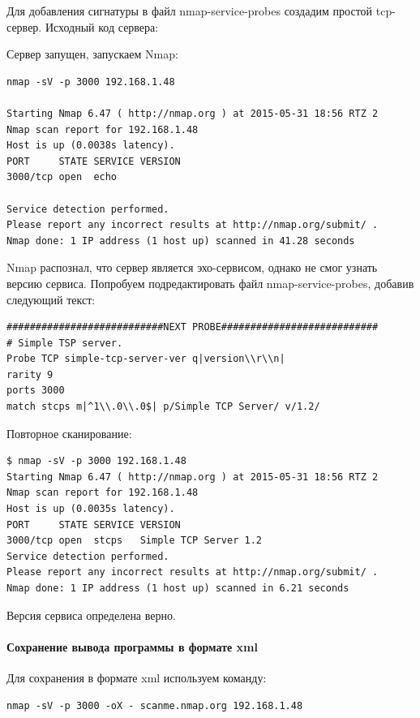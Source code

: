 \documentclass[a4paper, 14pt]{article}				%
\begin{document}
Для добавления сигнатуры в файл nmap-service-probes создадим простой tcp-сервер. Исходный код сервера:


Сервер запущен, запускаем Nmap:
\begin{Verbatim}[frame=single]
nmap -sV -p 3000 192.168.1.48

Starting Nmap 6.47 ( http://nmap.org ) at 2015-05-31 18:56 RTZ 2
Nmap scan report for 192.168.1.48
Host is up (0.0038s latency).
PORT     STATE SERVICE VERSION
3000/tcp open  echo

Service detection performed.
Please report any incorrect results at http://nmap.org/submit/ .
Nmap done: 1 IP address (1 host up) scanned in 41.28 seconds
\end{Verbatim}
Nmap распознал, что сервер является эхо-сервисом, однако не смог узнать версию сервиса. Попробуем подредактировать файл nmap-service-probes, добавив следующий текст:
\begin{Verbatim}[frame=single]
###########################NEXT PROBE###########################
# Simple TSP server.
Probe TCP simple-tcp-server-ver q|version\\r\\n|
rarity 9
ports 3000
match stcps m|^1\\.0\\.0$| p/Simple TCP Server/ v/1.2/
\end{Verbatim}

Повторное сканирование:

\begin{Verbatim}[frame=single]
$ nmap -sV -p 3000 192.168.1.48
Starting Nmap 6.47 ( http://nmap.org ) at 2015-05-31 18:56 RTZ 2
Nmap scan report for 192.168.1.48
Host is up (0.0035s latency).
PORT     STATE SERVICE VERSION
3000/tcp open  stcps   Simple TCP Server 1.2
Service detection performed. 
Please report any incorrect results at http://nmap.org/submit/ .
Nmap done: 1 IP address (1 host up) scanned in 6.21 seconds
\end{Verbatim}
Версия сервиса определена верно.

\paragraph{Сохранение вывода программы в формате xml\\}
Для сохранения в формате xml используем команду:
\begin{Verbatim}[frame=single]
nmap -sV -p 3000 -oX - scanme.nmap.org 192.168.1.48
\end{Verbatim}
\end{document}
